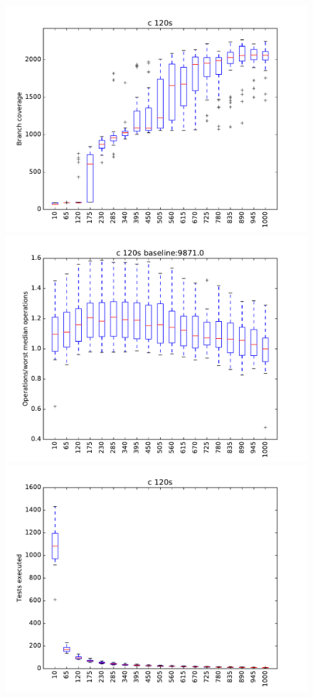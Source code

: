 \begin{figure}
\includegraphics[width=\columnwidth]{graphs/Crand120}
\includegraphics[width=\columnwidth]{graphs/opsCrand120}
\includegraphics[width=\columnwidth]{graphs/execCrand120}
\end{figure}


